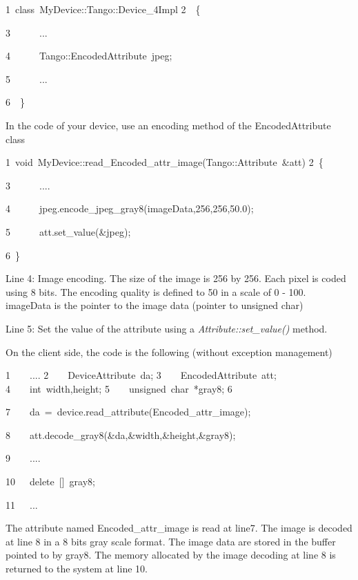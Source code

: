 

\begin{lyxcode}
1~class~MyDevice::Tango::Device\_4Impl
2~~\{

3~~~~~~...

4~~~~~~Tango::EncodedAttribute~jpeg;

5~~~~~~...

6~~\}
\end{lyxcode}


In the code of your device, use an encoding method of the EncodedAttribute
class



\begin{lyxcode}
1~void~MyDevice::read\_Encoded\_attr\_image(Tango::Attribute~\&att)
2~\{

3~~~~~~....

4~~~~~~jpeg.encode\_jpeg\_gray8(imageData,256,256,50.0);

5~~~~~~att.set\_value(\&jpeg);

6~\}
\end{lyxcode}


Line 4: Image encoding. The size of the image is 256 by 256. Each
pixel is coded using 8 bits. The encoding quality is defined to 50
in a scale of 0 - 100. imageData is the pointer to the image data
(pointer to unsigned char)

Line 5: Set the value of the attribute using a \emph{Attribute::set\_value()}
method.

On the client side, the code is the following (without exception management)



\begin{lyxcode}
1~~~~....
2~~~~DeviceAttribute~da;
3~~~~EncodedAttribute~att;
4~~~~int~width,height;
5~~~~unsigned~char~{*}gray8;
6~~~~~~

7~~~~da~=~device.read\_attribute(\textquotedbl{}Encoded\_attr\_image\textquotedbl{});

8~~~~att.decode\_gray8(\&da,\&width,\&height,\&gray8);

9~~~~....

10~~~delete~{[}{]}~gray8;

11~~~...
\end{lyxcode}


The attribute named Encoded\_attr\_image is read at line7. The image
is decoded at line 8 in a 8 bits gray scale format. The image data
are stored in the buffer pointed to by \textquotedbl{}gray8\textquotedbl{}.
The memory allocated by the image decoding at line 8 is returned to
the system at line 10.

